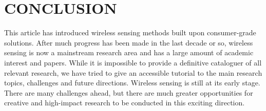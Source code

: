 \section{CONCLUSION}\label{sec:8conc}
This article has introduced wireless sensing methods built upon consumer-grade solutions. After much progress has been made in the last
decade or so, wireless sensing is now a mainstream research area and has a large amount of academic interest and papers. While it is
impossible to provide a definitive cataloguer of all relevant research, we have tried to give an accessible tutorial to the main research
topics, challenges and future directions. Wireless sensing is still at its early stage.  There are many challenges ahead, but there are
much greater opportunities for creative and high-impact research to be conducted in this exciting direction.
